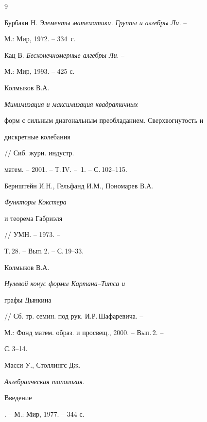 \begin{thebibliography}{9} 


 




Бурбаки Н. {\em Элементы математики. Группы и алгебры Ли.} -- 


М.: Мир, 1972. -- 334~с. 




Кац В. {\em Бесконечномерные алгебры Ли}. -- 


М.: Мир, 1993. -- 425 с. 




Колмыков В.А. {\em Минимизация и максимизация квадратичных 


форм с сильным диагональным преобладанием. Сверхвогнутость и 


дискретные колебания} // Сиб. журн. индустр. 


матем. -- 2001. -- Т.\,IV. -- \No\,1. -- С.\,102--115. 




Бернштейн И.Н., Гельфанд И.М., Пономарев В.А. {\em Функторы Кокстера 


и теорема Габриэля} // УМН. -- 1973. -- 


Т.\,28. -- Вып.\,2. -- С.\,19--33. 




Колмыков В.А. {\em Нулевой конус формы Картана--Титса и 


графы Дынкина} // Сб. тр. семин. под рук. И.Р.\,Шафаревича. -- 


М.: Фонд матем. образ. и просвещ., 2000. -- Вып.\,2. -- 


С.\,3--14. 




Масси У., Столлингс Дж. {\em Алгебраическая топология. 


Введение}. -- М.: Мир, 1977. -- 344 с. 


 


 


\end{thebibliography} 


 


\vskip 2cm 


 






 


\label{end} 


 



